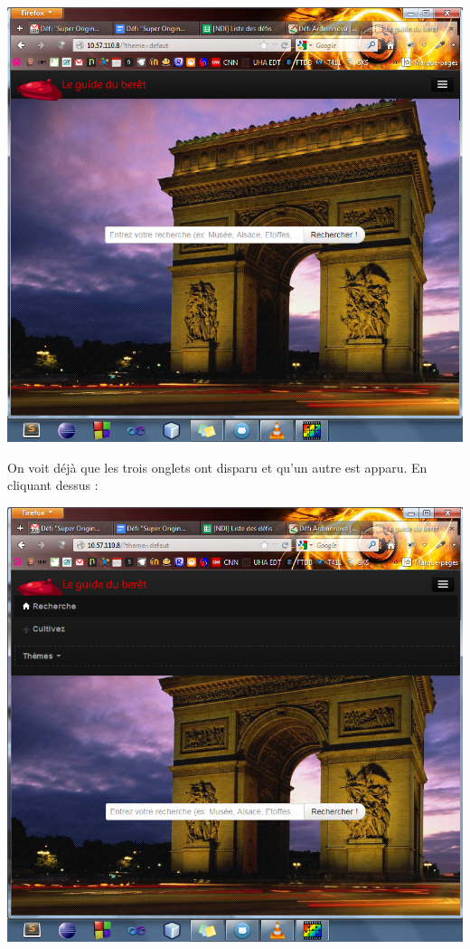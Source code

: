 \documentclass[12pt, a4paper]{article}
\newcommand{\espace}{\vspace{.8cm}}
\begin{document}
\begin{center}
\includegraphics[width=.9\textwidth, keepaspectratio=true]{img/accueil4.png}
\end{center}

\espace{}
On voit déjà que les trois onglets ont disparu et qu'un autre est apparu. En cliquant dessus : 

\begin{center}
\includegraphics[width=.9\textwidth, keepaspectratio=true]{img/accueil5.png}
\end{center}
\end{document}

